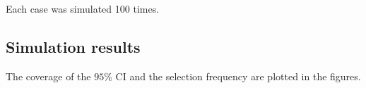 \documentclass[authoryear, review, 11pt]{elsarticle}
\begin{document}
		Each case was simulated 100 times.\\
	
	\subsection{Simulation results}
		The coverage of the $95\%$ CI and the selection frequency are plotted in the figures.\\
		

\end{document}

